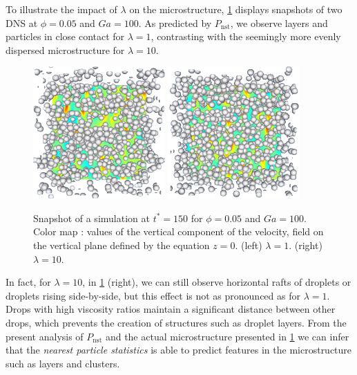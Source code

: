 \documentclass[11pt]{My_preprint}
\providecommand{\DIFadd}[1]{{\protect\color{blue}\uwave{#1}}} %
\providecommand{\DIFdel}[1]{{\protect\color{red}\sout{#1}}}                      %
\providecommand{\DIFaddbegin}{} %
\providecommand{\DIFaddend}{} %
\providecommand{\DIFdelbegin}{} %
\providecommand{\DIFdelend}{} %
\providecommand{\DIFaddFL}[1]{\DIFadd{#1}} %
\providecommand{\DIFdelFL}[1]{\DIFdel{#1}} %
\providecommand{\DIFaddbeginFL}{} %
\providecommand{\DIFaddendFL}{} %
\providecommand{\DIFdelbeginFL}{} %
\providecommand{\DIFdelendFL}{} %
\begin{document}
To illustrate the impact of $\lambda$ on the microstructure, \ref{fig:images} displays snapshots of two DNS at $\phi = 0.05$ and \DIFdelbegin \DIFdel{$Ga = 100$}\DIFdelend \DIFaddbegin \DIFadd{$Ga = 80$}\DIFaddend . 
As predicted by $P_\text{nst}$, we observe layers and particles in close contact for $\lambda = 1$, contrasting with the seemingly more evenly dispersed microstructure for $\lambda = 10$.
\begin{figure}[h!]
   \centering
   \DIFdelbeginFL %
\DIFdelendFL \DIFaddbeginFL \includegraphics[width=0.45\textwidth]{image/HOMOGENEOUS_final/Ga_80_phi_005_l_1.png}
   \includegraphics[width=0.45\textwidth]{image/HOMOGENEOUS_final/Ga_80_phi_005_l_10.png}
   \DIFaddendFL \caption{Snapshot of a simulation at \DIFdelbeginFL \DIFdelFL{$t^* = 150$ }\DIFdelendFL \DIFaddbeginFL \DIFaddFL{$t^* = 200$ }\DIFaddendFL for $\phi=0.05$ and \DIFdelbeginFL \DIFdelFL{$Ga=100$}\DIFdelendFL \DIFaddbeginFL \DIFaddFL{$Ga=80$}\DIFaddendFL .
   Color map : values of the vertical component of the velocity, field on the vertical plane defined by the equation $z=0$. 
   (left)  $\lambda = 1$.
   (right)  $\lambda = 10$.
   }
   \label{fig:images}
\end{figure}
In fact, for $\lambda = 10$, in \ref{fig:images} (right), we can still observe horizontal rafts of droplets or droplets rising side-by-side, but this effect is not as pronounced as for $\lambda = 1$. 
Drops with high viscosity ratios maintain a significant distance between other drops, which prevents the creation of structures such as droplet layers.
From the present analysis of $P_\text{nst}$ and the actual microstructure presented in \ref{fig:images} we can infer that the \textit{nearest particle statistics} is able to predict features in the microstructure such as layers and clusters. 
\end{document}
